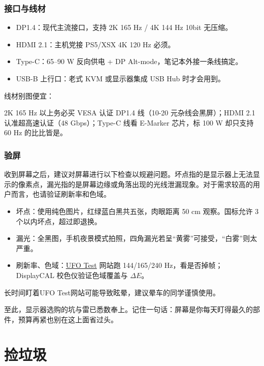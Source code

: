 \documentclass[../main.tex]{subfiles}
\begin{document}
\subsubsection{接口与线材}

\begin{itemize}
  \item DP1.4：现代主流接口，支持 2K 165 Hz / 4K 144 Hz 10bit 无压缩。
  \item HDMI 2.1：主机党接 PS5/XSX 4K 120 Hz 必须。
  \item Type-C：65–90 W 反向供电 + DP Alt-mode，笔记本外接一条线搞定。
  \item USB-B 上行口：老式 KVM 或显示器集成 USB Hub 时才会用到。
\end{itemize}

线材别图便宜：

2K 165 Hz 以上务必买 VESA 认证 DP1.4 线（10-20 元杂线会黑屏）；HDMI 2.1 认准超高速认证（48 Gbps）；Type-C 线看 E-Marker 芯片，标 100 W 却只支持 60 Hz 的比比皆是。

\subsubsection{验屏}

收到屏幕之后，建议对屏幕进行以下检查以规避问题。坏点指的是显示器上无法显示的像素点，漏光指的是屏幕边缘或角落出现的光线泄漏现象。对于需求较高的用户而言，也请验证刷新率和色域。

\begin{itemize}
  \item 坏点：使用纯色图片，红绿蓝白黑共五张，肉眼距离 50 cm 观察。国标允许 3 个以内坏点，超过即退换。
  \item 漏光：全黑图，手机夜景模式拍照，四角漏光若呈“黄雾”可接受，“白雾”则太严重。
  \item 刷新率、色域：\href{https://www.testufo.com/}{UFO Test} 网站跑 144/165/240 Hz，看是否掉帧；DisplayCAL 校色仪验证色域覆盖与 $\Delta E$。
\end{itemize}

\begin{caution}
  长时间盯着UFO Test网站可能导致眩晕，建议晕车的同学谨慎使用。
\end{caution}

至此，显示器选购的坑与雷已悉数奉上。记住一句话：屏幕是你每天盯得最久的部件，预算再紧也别在这上面省过头。

\section{捡垃圾}
\end{document}
